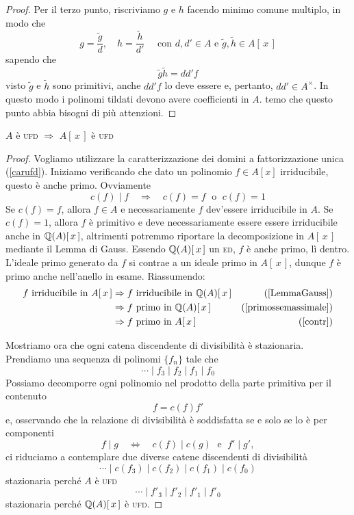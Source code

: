 \begin{multicols}{2}
\begin{proof}
	 Per il terzo punto, riscriviamo $ g $ e $ h $ facendo minimo comune multiplo, in modo che
	 \[ g = \frac{\tilde{g}}{d}, \quad h = \frac{\tilde{h}}{d'} \quad \text{ con } d, d' \in A \text{ e } \tilde{g}, \tilde{h} \in A[\,x\,]   \]
	 sapendo che
	 \[ \tilde{g}\tilde{h} = dd'f \]
	 visto $ \tilde{g} $ e $ \tilde{h} $ sono primitivi, anche $ dd'f $ lo deve essere e, pertanto, $ dd' \in A^{\times} $. In questo modo i polinomi tildati devono avere coefficienti in $ A $. \textsf{temo che questo punto abbia bisogni di più attenzioni.}
\end{proof}
\columnbreak
\begin{theorem}
	$ A $ è \textsc{ufd} $ \Rightarrow $ $ A[\,x\,] $ è \textsc{ufd}
\end{theorem}
\begin{proof}
	Vogliamo utilizzare la caratterizzazione dei domini a fattorizzazione unica (\ref{carufd}). 
	Iniziamo verificando che dato un polinomio $ f \in A[x] $ irriducibile, questo è anche primo. Ovviamente 
	\[ c(f) \mid f \quad\Rightarrow\quad c(f) = f \;\text{ o }\; c(f) = 1 \]
	Se $ c(f) = f $, allora $ f \in A $ e necessariamente $ f $ dev'essere irriducibile in $ A $.
	Se $ c(f) = 1 $, allora $ f $ è primitivo e deve necessariamente essere essere irriducibile anche in $ \mathbb{Q}(A)[\,x\,] $, altrimenti potremmo riportare la decomposizione in $ A[\,x\,] $ mediante il Lemma di Gauss.
	Essendo $ \mathbb{Q}(A)[\,x\,] $ un \textsc{ed}, $ f $ è anche primo, lì dentro. L'ideale primo generato da $ f $ si contrae a un ideale primo in $ A[\,x\,] $, dunque $ f $ è primo anche nell'anello in esame. Riassumendo:
	\begin{align*}
		f \text{ irriducibile in } A[\,x\,] & \Rightarrow f \text{ irriducibile in } \mathbb{Q}(A)[\,x\,] & (\ref{LemmaGauss}) \\
		& \Rightarrow f \text{ primo in } \mathbb{Q}(A)[\,x\,] & (\ref{primossemassimale}) \\
		& \Rightarrow f \text{ primo in } A[\,x\,] & (\ref{contr}) \\
	\end{align*}
	
	
	Mostriamo ora che ogni catena discendente di divisibilità è stazionaria. Prendiamo una sequenza di polinomi $ \{ f_n \} $ tale che
	\[ \cdots \mid f_3 \mid f_2 \mid f_1 \mid f_0 \]
	Possiamo decomporre ogni polinomio nel prodotto della parte primitiva per il contenuto
	\[ f = c(f)f' \]
	e, osservando che la relazione di divisibilità è soddisfatta se e solo se lo è per componenti
	\[ f \mid g \quad\Leftrightarrow\quad c(f) \mid c(g) \;\text{ e }\; f' \mid g', \]
	ci riduciamo a contemplare due diverse catene discendenti di divisibilità
	\[ \cdots \mid c(f_3) \mid c(f_2) \mid c(f_1) \mid c(f_0) \]
	stazionaria perché  $ A $ è \textsc{ufd}
	\[ \cdots \mid f'_3 \mid f'_2 \mid f'_1 \mid f'_0 \]
	stazionaria perché  $ \mathbb{Q}(A)[\,x\,] $ è \textsc{ufd}.
\end{proof}




\end{multicols}
